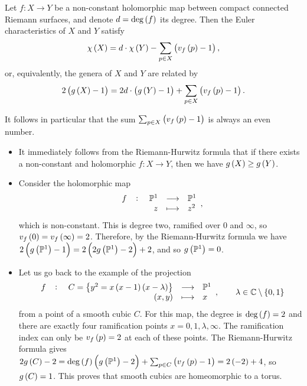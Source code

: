 \begin{theorem}
Let $ f : X \to Y $ be a non-constant holomorphic map between compact connected Riemann surfaces, and denote $ d = \deg\br{f} $ its degree. Then the Euler characteristics of $ X $ and $ Y $ satisfy
$$ \chi\br{X} = d \cdot \chi\br{Y} - \sum_{p \in X} \br{v_f\br{p} - 1}, $$
or, equivalently, the genera of $ X $ and $ Y $ are related by
$$ 2\br{g\br{X} - 1} = 2d \cdot \br{g\br{Y} - 1} + \sum_{p \in X} \br{v_f\br{p} - 1}. $$
\end{theorem}

\begin{remark}
It follows in particular that the sum $ \sum_{p \in X} \br{v_f\br{p} - 1} $ is always an even number.
\end{remark}

\begin{example}
\hfill
\begin{itemize}
\item It immediately follows from the Riemann-Hurwitz formula that if there exists a non-constant and holomorphic $ f : X \to Y $, then we have $ g\br{X} \ge g\br{Y} $.
\item Consider the holomorphic map
$$ \function[f]{\P^1}{\P^1}{z}{z^2}, $$
which is non-constant. This is degree two, ramified over $ 0 $ and $ \infty $, so $ v_f\br{0} = v_f\br{\infty} = 2 $. Therefore, by the Riemann-Hurwitz formula we have $ 2\br{g\br{\P^1} - 1} = 2\br{2g\br{\P^1} - 2} + 2 $, and so $ g\br{\P^1} = 0 $.
\item Let us go back to the example of the projection
$$ \function[f]{C = \cbr{y^2 = x\br{x - 1}\br{x - \lambda}}}{\P^1}{\br{x, y}}{x}, \qquad \lambda \in \C \setminus \cbr{0, 1} $$
from a point of a smooth cubic $ C $. For this map, the degree is $ \deg\br{f} = 2 $ and there are exactly four ramification points $ x = 0, 1, \lambda, \infty $. The ramification index can only be $ v_f\br{p} = 2 $ at each of these points. The Riemann-Hurwitz formula gives $ 2g\br{C} - 2 = \deg\br{f}\br{g\br{\P^1} - 2} + \sum_{p \in C} \br{v_f\br{p} - 1} = 2\br{-2} + 4 $, so $ g\br{C} = 1 $. This proves that smooth cubics are homeomorphic to a torus.
\end{itemize}
\end{example}

